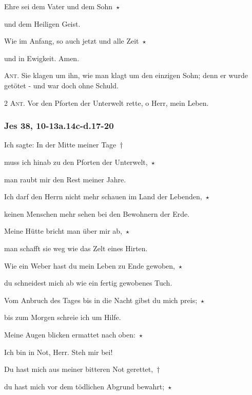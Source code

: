 \noindent Ehre sei dem Vater und dem Sohn~$\star$~\nopagebreak

und dem Heiligen Geist.

\noindent Wie im Anfang, so auch jetzt und alle Zeit~$\star$~\nopagebreak

und in Ewigkeit. Amen.

\vspace{10pt}

\noindent \textsc{Ant.} Sie klagen um ihn, wie man klagt um den einzigen Sohn; denn er wurde getötet - und war doch ohne Schuld.


\newpage

\noindent \textsc{2 Ant.} Vor den Pforten der Unterwelt rette, o Herr, mein Leben.

\subsubsection{Jes 38, 10-13a.14c-d.17-20}

\noindent Ich sagte: In der Mitte meiner Tage~†~\nopagebreak

muss ich hinab zu den Pforten der Unterwelt,~$\star$~\nopagebreak

man raubt mir den Rest meiner Jahre.

\noindent Ich darf den Herrn nicht mehr schauen im Land der Lebenden,~$\star$~\nopagebreak

keinen Menschen mehr sehen bei den Bewohnern der Erde.

\noindent Meine Hütte bricht man über mir ab,~$\star$~\nopagebreak

man schafft sie weg wie das Zelt eines Hirten. 

\noindent Wie ein Weber hast du mein Leben zu Ende gewoben,~$\star$~\nopagebreak

du schneidest mich ab wie ein fertig gewobenes Tuch. 

\noindent Vom Anbruch des Tages bis in die Nacht gibst du mich preis;~$\star$~\nopagebreak

bis zum Morgen schreie ich um Hilfe.

\noindent Meine Augen blicken ermattet nach oben:~$\star$~\nopagebreak

Ich bin in Not, Herr. Steh mir bei!

\noindent Du hast mich aus meiner bitteren Not gerettet,~†~\nopagebreak

du hast mich vor dem tödlichen Abgrund bewahrt;~$\star$~\nopagebreak


